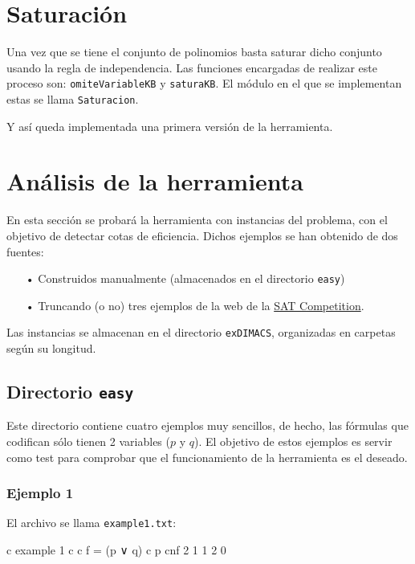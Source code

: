 \newpage
\section{Saturación}

Una vez que se tiene el conjunto de polinomios basta saturar dicho conjunto usando la regla de independencia. Las funciones encargadas de realizar este proceso son: \texttt{omiteVariableKB} y \texttt{saturaKB}. El módulo en el que se implementan estas se llama \texttt{Saturacion}.


Y así queda implementada una primera versión de la herramienta.

\newpage
\section{Análisis de la herramienta}

En esta sección se probará la herramienta con instancias del problema, con el objetivo de detectar cotas de eficiencia. Dichos ejemplos se han obtenido de dos fuentes:
\begin{itemize}
\item[•] Construidos manualmente (almacenados en el directorio \texttt{easy})
\item[•] Truncando (o no) tres ejemplos de la web de la \href{http://www.satcompetition.org}{SAT Competition}.
\end{itemize}

 Las instancias se almacenan en el directorio \texttt{exDIMACS}, organizadas en carpetas según su longitud.

\subsection{Directorio \texttt{easy}}
Este directorio contiene cuatro ejemplos muy sencillos, de hecho, las fórmulas que codifican sólo  tienen 2 variables ($p$ y $q$). El objetivo de estos ejemplos es servir como test para comprobar que el funcionamiento de la herramienta es el deseado.

\subsubsection{Ejemplo 1}

El archivo se llama \texttt{example1.txt}:
\begin{codigo}
c example 1 
c 
c f = (p ∨ q)
c
p cnf 2 1 
1 2 0
\end{codigo}


